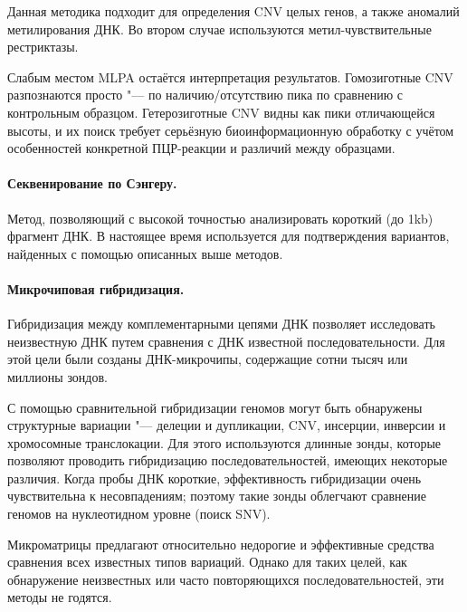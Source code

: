 \documentclass[a4paper,12pt]{article}
\begin{document}
Данная методика подходит для определения CNV целых генов, а также аномалий метилирования ДНК.
Во втором случае используются метил-чувствительные рестриктазы.

Слабым местом MLPA остаётся интерпретация результатов.
Гомозиготные CNV разпознаются просто "--- по наличию/отсутствию пика по сравнению с контрольным образцом.
Гетерозиготные CNV видны как пики отличающейся высоты, и их поиск требует серьёзную биоинформационную обработку с учётом особенностей конкретной ПЦР-реакции и различий между образцами\cite{stuppia}.


\paragraph{Секвенирование по Сэнгеру.}
Метод, позволяющий с высокой точностью анализировать короткий (до 1kb) фрагмент ДНК\cite{sanger}.
В настоящее время используется для подтверждения вариантов, найденных с помощью описанных выше методов.

\paragraph{Микрочиповая гибридизация.}
Гибридизация между комплементарными цепями ДНК позволяет исследовать неизвестную ДНК путем сравнения с ДНК известной последовательности.
Для этой цели были созданы ДНК-микрочипы, содержащие сотни тысяч или миллионы зондов.
    
С помощью сравнительной гибридизации геномов могут быть обнаружены структурные вариации "--- делеции и дупликации, CNV, инсерции, инверсии и хромосомные транслокации.
Для этого используются длинные зонды, которые позволяют проводить гибридизацию последовательностей, имеющих некоторые различия.
Когда пробы ДНК короткие, эффективность гибридизации очень чувствительна к несовпадениям; поэтому такие зонды облегчают сравнение геномов на нуклеотидном уровне (поиск SNV).

Микроматрицы предлагают относительно недорогие и эффективные средства сравнения всех известных типов вариаций.
Однако для таких целей, как обнаружение неизвестных или часто повторяющихся последовательностей, эти методы не годятся\cite{gresham}.
\end{document}
